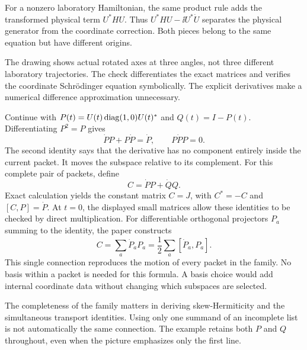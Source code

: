 For a nonzero laboratory Hamiltonian, the same product rule adds the transformed physical term $U^*HU$. Thus $U^*HU-\ii U^*\dot U$ separates the physical generator from the coordinate correction. Both pieces belong to the same equation but have different origins.

The drawing shows actual rotated axes at three angles, not three different laboratory trajectories. The check differentiates the exact matrices and verifies the coordinate Schr\"odinger equation symbolically. The explicit derivatives make a numerical difference approximation unnecessary.

Continue with $P(t)=U(t)\operatorname{diag}(1,0)U(t)^*$ and $Q(t)=I-P(t)$. Differentiating $P^2=P$ gives
\[
\dot P P+P\dot P=\dot P,
\qquad P\dot P P=0.
\]
The second identity says that the derivative has no component entirely inside the current packet. It moves the subspace relative to its complement.
For this complete pair of packets, define
\[
C=\dot P P+\dot Q Q.
\]
Exact calculation yields the constant matrix $C=J$, with $C^*=-C$ and $[C,P]=\dot P$. At $t=0$, the displayed small matrices allow these identities to be checked by direct multiplication.
For differentiable orthogonal projectors $P_a$ summing to the identity, the paper constructs
\[
C=\sum_a\dot P_aP_a=\frac12\sum_a[\dot P_a,P_a].
\]
This single connection reproduces the motion of every packet in the family. No basis within a packet is needed for this formula. A basis choice would add internal coordinate data without changing which subspaces are selected.

The completeness of the family matters in deriving skew-Hermiticity and the simultaneous transport identities. Using only one summand of an incomplete list is not automatically the same connection. The example retains both $P$ and $Q$ throughout, even when the picture emphasizes only the first line.

